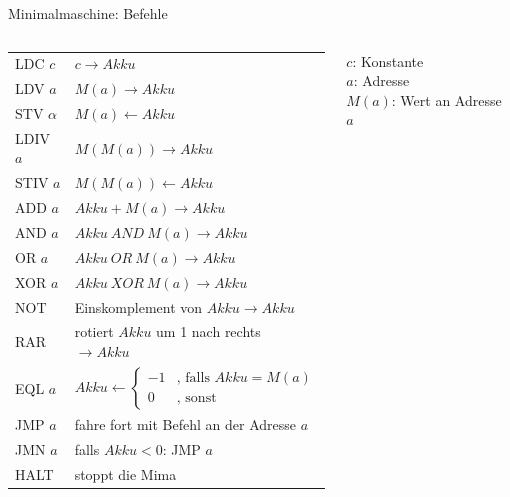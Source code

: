\begin{frame}{Minimalmaschine: Befehle}\small
\begin{columns}
	\begin{column}{0.6\textwidth}
		\begin{tabular}{|l|l|}
			\toprule
				LDC $c$ & $c \rightarrow Akku$ \\
				LDV $a$ & $M(a) \rightarrow Akku$ \\
				STV $\alpha$ & $M(a) \leftarrow Akku$ \\
				LDIV $a$ & $M(M(a)) \rightarrow Akku$ \\
				STIV $a$ &$M(M(a)) \leftarrow Akku$ \\
				\midrule
				ADD $a$ & $Akku + M(a) \rightarrow Akku$ \\
				AND $a$ & $Akku \ AND \ M(a) \rightarrow Akku$ \\
				OR $a$ & $Akku \ OR \ M(a) \rightarrow Akku$\\
				XOR $a$ & $Akku \ XOR \ M(a) \rightarrow Akku$\\
				NOT & Einskomplement von $Akku \rightarrow Akku$\\
				RAR & rotiert $Akku$ um 1 nach rechts $\rightarrow Akku$\\
				\midrule
				EQL $a$ & $Akku \leftarrow \begin{cases}
											-1 & \text{, falls } Akku = M(a) \\
											0 & \text{, sonst} 
											\end{cases}$\\
				\midrule
				JMP $a$ & fahre fort mit Befehl an der Adresse $a$\\
				JMN $a$ & falls $Akku < 0$: JMP $a$\\
				HALT & stoppt die Mima\\
			\bottomrule	
		\end{tabular}
	\end{column}

	\begin{column}{0.32\textwidth}
		$c$: Konstante \\
		$a$: Adresse \\
		$M(a)$: Wert an Adresse $a$
	\end{column}
\end{columns}
\end{frame}

